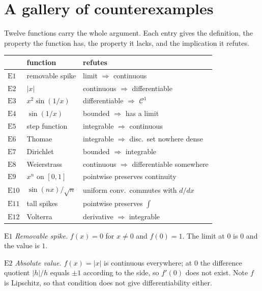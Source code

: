 \section{A gallery of counterexamples}
\label{sec:gallery}

Twelve functions carry the whole argument. Each entry gives the definition,
the property the function has, the property it lacks, and the implication it
refutes.

\begin{center}
\begin{tabular}{@{}lll@{}}
\toprule
& \textbf{function} & \textbf{refutes} \\
\midrule
$\mathrm{E}1$  & removable spike      & limit $\Rightarrow$ continuous \\
$\mathrm{E}2$  & $|x|$                & continuous $\Rightarrow$ differentiable \\
$\mathrm{E}3$  & $x^2\sin(1/x)$       & differentiable $\Rightarrow$ $\mathscr{C}^1$ \\
$\mathrm{E}4$  & $\sin(1/x)$          & bounded $\Rightarrow$ has a limit \\
$\mathrm{E}5$  & step function        & integrable $\Rightarrow$ continuous \\
$\mathrm{E}6$  & Thomae               & integrable $\Rightarrow$ disc.\ set nowhere dense \\
$\mathrm{E}7$  & Dirichlet            & bounded $\Rightarrow$ integrable \\
$\mathrm{E}8$  & Weierstrass          & continuous $\Rightarrow$ differentiable somewhere \\
$\mathrm{E}9$  & $x^n$ on $[0,1]$     & pointwise preserves continuity \\
$\mathrm{E}10$ & $\sin(nx)/\sqrt n$   & uniform conv.\ commutes with $d/dx$ \\
$\mathrm{E}11$ & tall spikes          & pointwise preserves $\int$ \\
$\mathrm{E}12$ & Volterra             & derivative $\Rightarrow$ integrable \\
\bottomrule
\end{tabular}
\end{center}

\medskip
\noindent
$\mathrm{E}1$ \emph{Removable spike.} $f(x)=0$ for $x\ne0$ and $f(0)=1$. The
limit at $0$ is $0$ and the value is $1$.

\smallskip\noindent
$\mathrm{E}2$ \emph{Absolute value.} $f(x)=|x|$ is continuous everywhere; at
$0$ the difference quotient $|h|/h$ equals $\pm1$ according to the side, so
$f'(0)$ does not exist. Note $f$ is Lipschitz, so that condition does not
give differentiability either.

